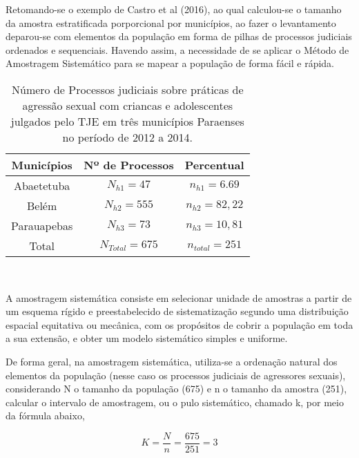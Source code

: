 Retomando-se o exemplo de Castro et al (2016), ao qual calculou-se o tamanho da
amostra estratificada porporcional por municípios, ao fazer o levantamento deparou-se com elementos da população em forma de pilhas de processos judiciais ordenados
e sequenciais. Havendo assim, a necessidade de se aplicar o Método de Amostragem
Sistemático para se mapear a população de forma fácil e rápida.


\begin{table}[!htb]
    \centering
    {
    \caption{Número de Processos judiciais sobre práticas de agressão sexual com criancas e
adolescentes julgados pelo TJE em três municípios Paraenses no período de 2012 a 2014.}
    \label{amostras estratificada}
    \vspace{0.1cm}
\begin{tabular}{c|c|c}
  \hline\hline
  Municípios   & Nº de Processos &  Percentual \\
  \hline\hline
   Abaetetuba  & $N_{h1}=47$     & $n_{h1}= 6.69$        \\
   Belém       & $N_{h2}=555$    & $n_{h2}= 82,22$       \\
   Parauapebas & $N_{h3}=73$     & $n_{h3}= 10,81$       \\
   \hline\hline 
   Total       & $N_{Total}=675$ & $n_{total}=251$ \\ 
  \hline\hline
\end{tabular}}
\\
\hspace{-1.0cm}
\end{table}



A amostragem sistemática consiste em selecionar unidade de amostras a partir
de um esquema rígido e preestabelecido de sistematização segundo uma distribuição
espacial equitativa ou mecânica, com os propósitos de cobrir a população em toda
a sua extensão, e obter um modelo sistemático simples e uniforme.
\vskip0.3cm

De forma geral, na amostragem sistemática, utiliza-se a ordenação natural dos
elementos da população (nesse caso os processos judiciais de agressores sexuais),
considerando N o tamanho da população (675) e n o tamanho da amostra (251),
calcular o intervalo de amostragem, ou o pulo sistemático, chamado k, por meio da
fórmula abaixo,

\begin{equation}
K=\frac{N}{n}=\frac{675}{251}=3
\end{equation}

